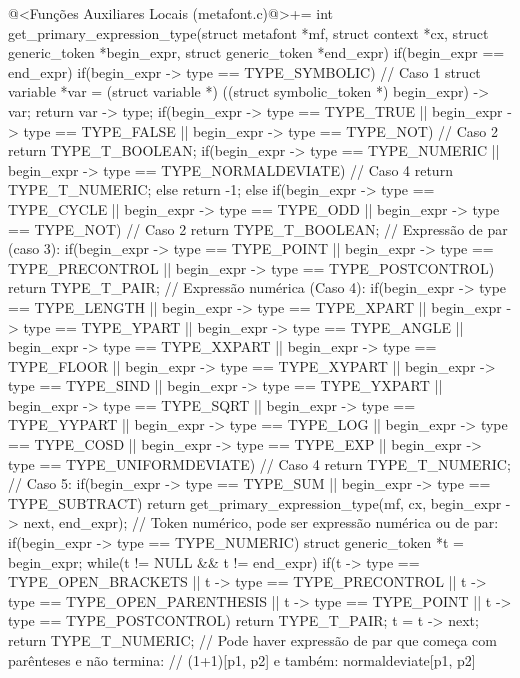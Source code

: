 {\iniciocodigo
@<Funções Auxiliares Locais (metafont.c)@>+=
int get_primary_expression_type(struct metafont *mf, struct context *cx,
                               struct generic_token *begin_expr,
                               struct generic_token *end_expr){
  if(begin_expr == end_expr){
    if(begin_expr -> type == TYPE_SYMBOLIC){ // Caso 1
      struct variable *var = (struct variable *)
                               ((struct symbolic_token *) begin_expr) -> var;
      return var -> type;
    }
    if(begin_expr -> type == TYPE_TRUE || begin_expr -> type == TYPE_FALSE ||
       begin_expr -> type == TYPE_NOT) // Caso 2
      return TYPE_T_BOOLEAN;
    if(begin_expr -> type == TYPE_NUMERIC ||
       begin_expr -> type == TYPE_NORMALDEVIATE) // Caso 4
      return TYPE_T_NUMERIC;
    else
      return -1;
  }
  else{
    if(begin_expr -> type == TYPE_CYCLE || begin_expr -> type == TYPE_ODD ||
       begin_expr -> type == TYPE_NOT) // Caso 2
      return TYPE_T_BOOLEAN;
    // Expressão de par (caso 3):
    if(begin_expr -> type == TYPE_POINT ||
       begin_expr -> type == TYPE_PRECONTROL ||
       begin_expr -> type == TYPE_POSTCONTROL)
      return TYPE_T_PAIR;    
    // Expressão numérica (Caso 4):
    if(begin_expr -> type == TYPE_LENGTH || begin_expr -> type == TYPE_XPART ||
       begin_expr -> type == TYPE_YPART || begin_expr -> type == TYPE_ANGLE ||
       begin_expr -> type == TYPE_XXPART || begin_expr -> type == TYPE_FLOOR ||
       begin_expr -> type == TYPE_XYPART || begin_expr -> type == TYPE_SIND ||
       begin_expr -> type == TYPE_YXPART || begin_expr -> type == TYPE_SQRT ||
       begin_expr -> type == TYPE_YYPART || begin_expr -> type == TYPE_LOG ||
       begin_expr -> type == TYPE_COSD ||   begin_expr -> type == TYPE_EXP ||
       begin_expr -> type == TYPE_UNIFORMDEVIATE) // Caso 4
      return TYPE_T_NUMERIC;
    // Caso 5:
    if(begin_expr -> type == TYPE_SUM || begin_expr -> type == TYPE_SUBTRACT)
      return get_primary_expression_type(mf, cx, begin_expr -> next, end_expr);
    // Token numérico, pode ser expressão numérica ou de par:
    if(begin_expr -> type == TYPE_NUMERIC){
      struct generic_token *t = begin_expr;
      while(t != NULL && t != end_expr){
        if(t -> type == TYPE_OPEN_BRACKETS || t -> type == TYPE_PRECONTROL ||
           t -> type == TYPE_OPEN_PARENTHESIS || t -> type == TYPE_POINT ||
           t -> type == TYPE_POSTCONTROL)
          return TYPE_T_PAIR;
        t = t -> next;
      }
      return TYPE_T_NUMERIC;
    }
    // Pode haver expressão de par que começa com parênteses e não termina:
    // (1+1)[p1, p2] e também: normaldeviate[p1, p2]
}}}
